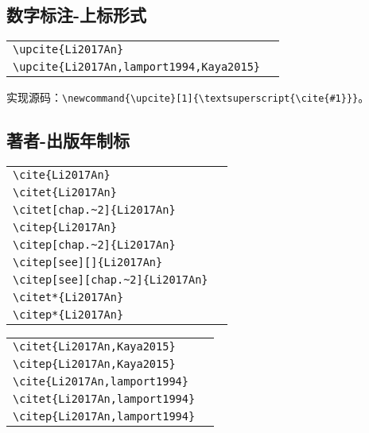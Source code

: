 \subsection{数字标注-上标形式}
\noindent
\begin{tabular}{l@{\quad$\Rightarrow$\quad}l}
	\verb|\upcite{Li2017An}| & \upcite{Li2017An}\\
	\verb|\upcite{Li2017An,lamport1994,Kaya2015}| & \upcite{Li2017An,lamport1994,Kaya2015}\\
\end{tabular}
\par\noindent
实现源码：\verb|\newcommand{\upcite}[1]{\textsuperscript{\cite{#1}}}|。


\subsection{著者-出版年制标}
\noindent
\begin{tabular}{l@{\quad$\Rightarrow$\quad}l}
	\verb|\cite{Li2017An}| & \cite{Li2017An}\\
	\verb|\citet{Li2017An}| & \citet{Li2017An}\\
	\verb|\citet[chap.~2]{Li2017An}| & \citet[chap.~2]{Li2017An}\\[0.5ex]
	\verb|\citep{Li2017An}| & \citep{Li2017An}\\
	\verb|\citep[chap.~2]{Li2017An}| & \citep[chap.~2]{Li2017An}\\
	\verb|\citep[see][]{Li2017An}| & \citep[see][]{Li2017An}\\
	\verb|\citep[see][chap.~2]{Li2017An}| & \citep[see][chap.~2]{Li2017An}\\[0.5ex]
	\verb|\citet*{Li2017An}| & \citet*{Li2017An}\\
	\verb|\citep*{Li2017An}| & \citep*{Li2017An}\\
\end{tabular}
\par\noindent
\begin{tabular}{l@{\quad$\Rightarrow$\quad}l}
	\verb|\citet{Li2017An,Kaya2015}| & \citet{Li2017An,Kaya2015}\\
	\verb|\citep{Li2017An,Kaya2015}| & \citep{Li2017An,Kaya2015}\\
	\verb|\cite{Li2017An,lamport1994}| & \cite{Li2017An,lamport1994}\\
	\verb|\citet{Li2017An,lamport1994}| & \citet{Li2017An,lamport1994}\\
	\verb|\citep{Li2017An,lamport1994}| & \citep{Li2017An,lamport1994}\\
\end{tabular}

